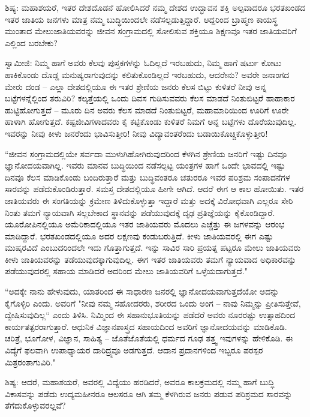 ಶಿಷ್ಯ: ಮಹಾಶಯರೆ, ಇತರ ದೇಶದೊಡನೆ ಹೋಲಿಸಿದರೆ ನಮ್ಮ ದೇಶದ ಉದ್ಭಾವನ ಶಕ್ತಿ ಅಲ್ಪವಾದರೂ ಭರತಖಂಡದ ಇತರ ಜಾತಿಯ ಜನಗಳು ಮಾತ್ರ ನಮ್ಮ ಬುದ್ಧಿಯಿಂದಲೇ ನಡೆಸಲ್ಪಡುತ್ತಿದ್ದಾರೆ. ಆದ್ದರಿಂದ ಬ್ರಾಹ್ಮಣ ಕಾಯಸ್ಥ ಮುಂತಾದ ಮೇಲುಜಾತಿಯವರನ್ನು ಜೀವನ ಸಂಗ್ರಾಮದಲ್ಲಿ ಸೋಲಿಸುವ ಶಕ್ತಿಯೂ ಶಿಕ್ಷಣವೂ ಇತರ ಜಾತಿಯವರಿಗೆ ಎಲ್ಲಿಂದ ಬರಬೇಕು?

ಸ್ವಾಮೀಜಿ: ನಿಮ್ಮ ಹಾಗೆ ಅವರು ಕೆಲವು ಪುಸ್ತಕಗಳನ್ನು ಓದಿಲ್ಲದೆ ಇರಬಹುದು, ನಿಮ್ಮ ಹಾಗೆ ಷರ್ಟು ಕೋಟು ಹಾಕಿಕೊಂಡು ದೊಡ್ಡ ಮನುಷ್ಯರಾಗುವುದನ್ನು ಕಲಿತುಕೊಂಡಿಲ್ಲದೆ ಇರಬಹುದು, ಆದರೇನು? ಅವರೇ ಜನಾಂಗದ ಮೇರು ದಂಡ – ಎಲ್ಲಾ ದೇಶದಲ್ಲಿಯೂ ಈ ಇತರ ಶ್ರೇಣಿಯ ಜನರು ಕೆಲಸ ಬಿಟ್ಟು ಕುಳಿತರೆ ನೀವು ಅನ್ನ ಬಟ್ಟೆಗಳನ್ನೆಲ್ಲಿಂದ ತರುವಿರಿ? ಕಲ್ಕತ್ತೆಯಲ್ಲಿ ಒಂದು ದಿವಸ ಗುಡಿಸುವವರು ಕೆಲಸ ಮಾಡದೆ ನಿಂತುಬಿಟ್ಟರೆ ಹಾಹಾಕಾರ ಹುಟ್ಟಿಹೋಗುತ್ತದೆ – ಮೂರು ದಿನ ಅವರು ಕೆಲಸ ಮಾಡದೆ ನಿಂತುಬಿಟ್ಟರೆ, ಮಹಾಮಾರಿಯಿಂದ ಊರಿಗೆ ಊರೇ ಹಾಳಾಗಿ ಹೋಗುತ್ತದೆ. ಕಷ್ಟಜೀವಿಗಳಾದವರು ಕೈ ಕಟ್ಟಿಕೊಂಡು ಕುಳಿತರೆ ನಿಮಗೆ ಅನ್ನ ಬಟ್ಟೆಗಳು ದೊರೆಯುವುದಿಲ್ಲ. ಇವರನ್ನು ನೀವು ಕೀಳು ಜನರೆಂದು ಭಾವಿಸುತ್ತೀರಿ! ನೀವು ವಿದ್ಯಾವಂತರೆಂದು ಬಡಾಯಿಕೊಚ್ಚಿಕೊಳ್ಳುತ್ತೀರಿ!

“ಜೀವನ ಸಂಗ್ರಾಮದಲ್ಲಿಯೇ ಸರ್ವದಾ ಮುಳುಗಿಹೋಗಿರುವುದರಿಂದ ಕೆಳಗಿನ ಶ್ರೇಣಿಯ ಜನರಿಗೆ ಇಷ್ಟು ದಿನವೂ ಜ್ಞಾನೋದಯವಾಗಿಲ್ಲ. ಇವರು ಮಾನವ ಬುದ್ಧಿಯಿಂದ ನಡೆಸಲ್ಪಟ್ಟ ಯಂತ್ರಗಳ ಹಾಗೆ ಒಂದೇ ಭಾವದಲ್ಲಿ ಇಷ್ಟು ದಿನವೂ ಕೆಲಸ ಮಾಡಿಕೊಂಡು ಬಂದಿರುತ್ತಾರೆ ಮತ್ತು ಬುದ್ಧಿವಂತರೂ ಚತುರರೂ ಇವರ ಪರಿಶ್ರಮ ಸಂಪಾದನೆಗಳ ಸಾರವನ್ನು ಪಡೆದುಕೊಂಡಿರುತ್ತಾರೆ. ಸಮಸ್ತ ದೇಶದಲ್ಲಿಯೂ ಹೀಗೇ ಆಗಿದೆ. ಆದರೆ ಈಗ ಆ ಕಾಲ ಹೋಯಿತು. ಇತರ ಜಾತಿಯವರು ಈ ಸಂಗತಿಯನ್ನು ಕ್ರಮೇಣ ತಿಳಿದುಕೊಳ್ಳುತ್ತಾ ಇದ್ದಾರೆ ಮತ್ತು ಅದಕ್ಕೆ ವಿರೋಧವಾಗಿ ಎಲ್ಲರೂ ಸೇರಿ ನಿಂತು ತಮಗೆ ನ್ಯಾಯವಾಗಿ ಸಲ್ಲಬೇಕಾದ ಸ್ಥಾನವನ್ನು ಪಡೆಯುವುದಕ್ಕೆ ದೃಢ ಪ್ರತಿಜ್ಞೆಯನ್ನು ಕೈಕೊಂಡಿದ್ದಾರೆ. ಯೂರೋಪಿನಲ್ಲಿಯೂ ಅಮೆರಿಕಾದಲ್ಲಿಯೂ ಇತರ ಜಾತಿಯವರು ಮೊದಲು ಎಚ್ಚೆತ್ತು ಈ ಜಗಳವನ್ನು ಆರಂಭ ಮಾಡಿದ್ದಾರೆ. ಭರತಖಂಡದಲ್ಲಿಯೂ ಅದರ ಲಕ್ಷಣವು ಕಂಡುಬರುತ್ತಿದೆ. ಕೀಳು ಜಾತಿಯವರಲ್ಲಿ ಈಗ ಎಷ್ಟು ಮುಷ್ಕರವಿದೆ ಎಂಬುದರಿಂದಲೇ ಇದು ಗೊತ್ತಾಗುತ್ತದೆ. ಇನ್ನು ಸಾವಿರ ಸಾರಿ ಪ್ರಯತ್ನ ಪಟ್ಟರೂ ಮೇಲು ಜಾತಿಯವರು ಕೀಳು ಜಾತಿಯವರನ್ನು ತಡೆಯುವುದಕ್ಕಾಗುವುದಿಲ್ಲ. ಈಗ ಇತರ ಜಾತಿಯವರು ತಮಗೆ ನ್ಯಾಯವಾದ ಅಧಿಕಾರವನ್ನು ಪಡೆಯುವುದರಲ್ಲಿ ಸಹಾಯ ಮಾಡಿದರೆ ಅದರಿಂದ ಮೇಲು ಜಾತಿಯವರಿಗೆ ಒಳ್ಳೆಯದಾಗುತ್ತದೆ."

“ಅದಕ್ಕೇ ನಾನು ಹೇಳುವುದು, ಯಾತರಿಂದ ಈ ಸಾಧಾರಣ ಜನರಲ್ಲಿ ಜ್ಞಾನೋದಯವಾಗುತ್ತದೆಯೋ ಅದನ್ನು ಕೈಗೊಳ್ಳಿರಿ ಎಂದು. ಅವರಿಗೆ "ನೀವು ನಮ್ಮ ಸಹೋದರರು, ಶರೀರದ ಒಂದು ಅಂಗ – ನಾವು ನಿಮ್ಮನ್ನು ಪ್ರೀತಿಸುತ್ತೇವೆ, ದ್ವೇಷಿಸುವುದಿಲ್ಲ“ ಎಂದು ತಿಳಿಸಿ. ನಿಮ್ಮಿಂದ ಈ ಸಹಾನುಭೂತಿಯನ್ನು ಪಡೆದರೆ ಅವರು ನೂರರಷ್ಟು ಉತ್ಸಾಹದಿಂದ ಕಾರ್ಯತತ್ಪರರಾಗುತ್ತಾರೆ. ಆಧುನಿಕ ವಿಜ್ಞಾನಶಾಸ್ತ್ರದ ಸಹಾಯದಿಂದ ಅವರಿಗೆ ಜ್ಞಾನೋದಯವನ್ನು ಮಾಡಿಕೊಡಿ. ಚರಿತ್ರೆ, ಭೂಗೋಳ, ವಿಜ್ಞಾನ, ಸಾಹಿತ್ಯ – ಜೊತೆಜೊತೆಯಲ್ಲಿ ಧರ್ಮದ ಗೂಢ ತತ್ತ್ವ ಇವುಗಳನ್ನು ಹೇಳಿಕೊಡಿ. ಈ ವಿದ್ಯೆಗೆ ಫಲವಾಗಿ ಉಪಾಧ್ಯಾಯರ ದಾರಿದ್ರ್ಯವೂ ಅಡಗುತ್ತದೆ. ಆದಾನ ಪ್ರದಾನಗಳಿಂದ ಇಬ್ಬರೂ ಪರಸ್ಪರ ಮಿತ್ರರಂತಾಗುವಿರಿ."

ಶಿಷ್ಯ: ಆದರೆ, ಮಹಾಶಯರೆ, ಅವರಲ್ಲಿ ವಿದ್ಯೆಯು ಹರಡಿದರೆ, ಅವರೂ ಕಾಲಕ್ರಮದಲ್ಲಿ ನಮ್ಮ ಹಾಗೆ ಬುದ್ಧಿ ವಿಕಾಸವನ್ನು ಪಡೆದು ಉದ್ಯಮಹೀನರೂ ಆಲಸರೂ ಆಗಿ ತಮ್ಮ ಕೆಳಗಿರುವ ಜನರು ಪಡುವ ಪರಿಶ್ರಮದ ಸಾರವನ್ನು ತೆಗೆದುಕೊಳ್ಳುವರಲ್ಲವೆ?


